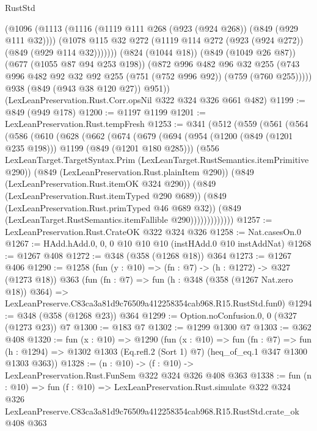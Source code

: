 \begin{lexlean}{RustStd}
\begin{coremodule}
            (@1096
              (@1113
                (@1116 (@1119 @111 @268 (@923 (@924 @268)) (@849 (@929 @111 @32))))
                (@1078 @115 @32 @272 (@1119 @114 @272 (@923 (@924 @272)) (@849 (@929 @114 @32)))))))
          (@824 (@1044 @18))
          (@849 (@1049 @26 @87))
          (@677 (@1055 @87 @94 @253 @198))
          (@872
            @996
            @482
            @96
            @32
            @255
            (@743 @996 @482 @92 @32 @92 @255 (@751 (@752 @996 @92)) (@759 (@760 @255)))))
        @938
        (@849 (@943 @38 @120 @27))
        @951))
    (LexLeanPreservation.Rust.Corr.opsNil @322 @324 @326 @661 @482)
@1199 := @849 (@949 @178)
@1200 := @1197 @1199
@1201 := LexLeanPreservation.Rust.tempFresh
@1253 := @341
    (@512
      (@559
        (@561
          (@564
            (@586
              (@610
                (@628
                  (@662
                    (@674
                      (@679
                        (@694
                          (@954 (@1200 (@849 (@1201 @235 @198))) @1199 (@849 (@1201 @180 @285)))
                          (@556
                            LexLeanTarget.TargetSyntax.Prim
                            (LexLeanTarget.RustSemantics.itemPrimitive @290))
                          (@849 (LexLeanPreservation.Rust.plainItem @290))
                          (@849 (LexLeanPreservation.Rust.itemOK @324 @290))
                          (@849 (LexLeanPreservation.Rust.itemTyped @290 @689))
                          (@849 (LexLeanPreservation.Rust.primTyped @46 @689 @32))
                          (@849 (LexLeanTarget.RustSemantics.itemFallible @290)))))))))))))
@1257 := LexLeanPreservation.Rust.CrateOK @322 @324 @326
@1258 := Nat.casesOn.{0}
@1267 := HAdd.hAdd.{0, 0, 0} @10 @10 @10 (instHAdd.{0} @10 instAddNat)
@1268 := @1267 @408
@1272 := @348 (@358 (@1268 @18)) @364
@1273 := @1267 @406
@1290 := @1258
    (fun (y : @10) => (fn : @7) -> (h : @1272) -> @327 (@1273 @18))
    @363
    (fun (fn : @7) =>
    fun (h : @348 (@358 (@1267 Nat.zero @18)) @364) =>
    LexLeanPreserve.C83ca3a81d9c76509a412258354cab968.R15.RustStd.fun0)
@1294 := @348 (@358 (@1268 @23)) @364
@1299 := Option.noConfusion.{0, 0} (@327 (@1273 @23)) @7
@1300 := @183 @7
@1302 := @1299 @1300 @7
@1303 := @362 @408
@1320 := fun (x : @10) =>
  @1290
    (fun (x : @10) =>
    fun (fn : @7) =>
    fun (h : @1294) => @1302 @1303 (Eq.refl.{2} (Sort 1) @7) (heq_of_eq.{1} @347 @1300 @1303 @363))
@1328 := (n : @10) -> (f : @10) -> LexLeanPreservation.Rust.FunSem @322 @324 @326 @408 @363
@1338 := fun (n : @10) =>
  fun (f : @10) =>
  LexLeanPreservation.Rust.simulate
    @322
    @324
    @326
    LexLeanPreserve.C83ca3a81d9c76509a412258354cab968.R15.RustStd.crate_ok
    @408
    @363
\end{coremodule}
\end{lexlean}
